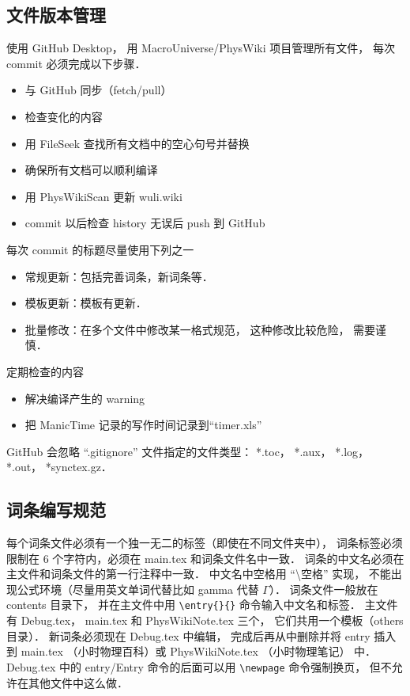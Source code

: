 \subsection{文件版本管理}
使用 GitHub Desktop， 用 MacroUniverse/PhysWiki 项目管理所有文件， 每次 commit 必须完成以下步骤．
\begin{itemize}
\item 与 GitHub 同步（fetch/pull）
\item 检查变化的内容
\item 用 FileSeek 查找所有文档中的空心句号并替换
\item 确保所有文档可以顺利编译
\item 用 PhysWikiScan 更新 wuli.wiki
\item commit 以后检查 history 无误后 push 到 GitHub
\end{itemize}
每次 commit 的标题尽量使用下列之一
\begin{itemize}
\item 常规更新：包括完善词条，新词条等．
\item 模板更新：模板有更新．
\item 批量修改：在多个文件中修改某一格式规范， 这种修改比较危险， 需要谨慎．
\end{itemize}
定期检查的内容
\begin{itemize}
\item 解决编译产生的 warning
\item 把 ManicTime 记录的写作时间记录到“timer.xls”
\end{itemize}

GitHub 会忽略 “.gitignore” 文件指定的文件类型： *.toc， *.aux， *.log， *.out， *synctex.gz．

\subsection{词条编写规范}

每个词条文件必须有一个独一无二的标签（即使在不同文件夹中）， 词条标签必须限制在 6 个字符内，必须在 main.tex 和词条文件名中一致． 词条的中文名必须在主文件和词条文件的第一行注释中一致． 中文名中空格用 “\textbackslash 空格” 实现， 不能出现公式环境（尽量用英文单词代替比如 gamma 代替 $\Gamma$）． 词条文件一般放在 contents 目录下， 并在主文件中用 \verb|\entry{}{}| 命令输入中文名和标签． 主文件有 Debug.tex， main.tex 和 PhysWikiNote.tex 三个， 它们共用一个模板（others 目录）． 新词条必须现在 Debug.tex 中编辑， 完成后再从中删除并将 entry 插入到 main.tex （小时物理百科）或 PhysWikiNote.tex （小时物理笔记） 中． Debug.tex 中的 entry/Entry 命令的后面可以用 \verb|\newpage| 命令强制换页， 但不允许在其他文件中这么做．

